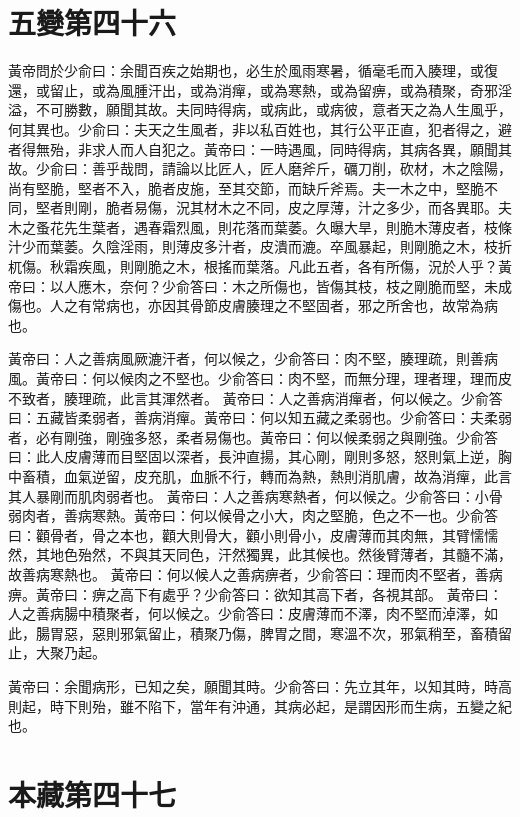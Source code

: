 \section{五變第四十六}

黃帝問於少俞曰：余聞百疾之始期也，必生於風雨寒暑，循毫毛而入腠理，或復還，或留止，或為風腫汗出，或為消癉，或為寒熱，或為留痹，或為積聚，奇邪淫溢，不可勝數，願聞其故。夫同時得病，或病此，或病彼，意者天之為人生風乎，何其異也。少俞曰：夫天之生風者，非以私百姓也，其行公平正直，犯者得之，避者得無殆，非求人而人自犯之。黃帝曰：一時遇風，同時得病，其病各異，願聞其故。少俞曰：善乎哉問，請論以比匠人，匠人磨斧斤，礪刀削，砍材，木之陰陽，尚有堅脆，堅者不入，脆者皮施，至其交節，而缺斤斧焉。夫一木之中，堅脆不同，堅者則剛，脆者易傷，況其材木之不同，皮之厚薄，汁之多少，而各異耶。夫木之蚤花先生葉者，遇春霜烈風，則花落而葉萎。久曝大旱，則脆木薄皮者，枝條汁少而葉萎。久陰淫雨，則薄皮多汁者，皮潰而漉。卒風暴起，則剛脆之木，枝折杌傷。秋霜疾風，則剛脆之木，根搖而葉落。凡此五者，各有所傷，況於人乎？黃帝曰：以人應木，奈何？少俞答曰：木之所傷也，皆傷其枝，枝之剛脆而堅，未成傷也。人之有常病也，亦因其骨節皮膚腠理之不堅固者，邪之所舍也，故常為病也。

黃帝曰：人之善病風厥漉汗者，何以候之，少俞答曰：肉不堅，腠理疏，則善病風。黃帝曰：何以候肉之不堅也。少俞答曰：肉不堅，而無分理，理者理，理而皮不致者，腠理疏，此言其渾然者。
黃帝曰：人之善病消癉者，何以候之。少俞答曰：五藏皆柔弱者，善病消癉。黃帝曰：何以知五藏之柔弱也。少俞答曰：夫柔弱者，必有剛強，剛強多怒，柔者易傷也。黃帝曰：何以候柔弱之與剛強。少俞答曰：此人皮膚薄而目堅固以深者，長沖直揚，其心剛，剛則多怒，怒則氣上逆，胸中畜積，血氣逆留，皮充肌，血脈不行，轉而為熱，熱則消肌膚，故為消癉，此言其人暴剛而肌肉弱者也。
黃帝曰：人之善病寒熱者，何以候之。少俞答曰：小骨弱肉者，善病寒熱。黃帝曰：何以候骨之小大，肉之堅脆，色之不一也。少俞答曰：顴骨者，骨之本也，顴大則骨大，顴小則骨小，皮膚薄而其肉無，其臂懦懦然，其地色殆然，不與其天同色，汗然獨異，此其候也。然後臂薄者，其髓不滿，故善病寒熱也。
黃帝曰：何以候人之善病痹者，少俞答曰：理而肉不堅者，善病痹。黃帝曰：痹之高下有處乎？少俞答曰：欲知其高下者，各視其部。
黃帝曰：人之善病腸中積聚者，何以候之。少俞答曰：皮膚薄而不澤，肉不堅而淖澤，如此，腸胃惡，惡則邪氣留止，積聚乃傷，脾胃之間，寒溫不次，邪氣稍至，畜積留止，大聚乃起。

黃帝曰：余聞病形，已知之矣，願聞其時。少俞答曰：先立其年，以知其時，時高則起，時下則殆，雖不陷下，當年有沖通，其病必起，是謂因形而生病，五變之紀也。



\section{本藏第四十七}

